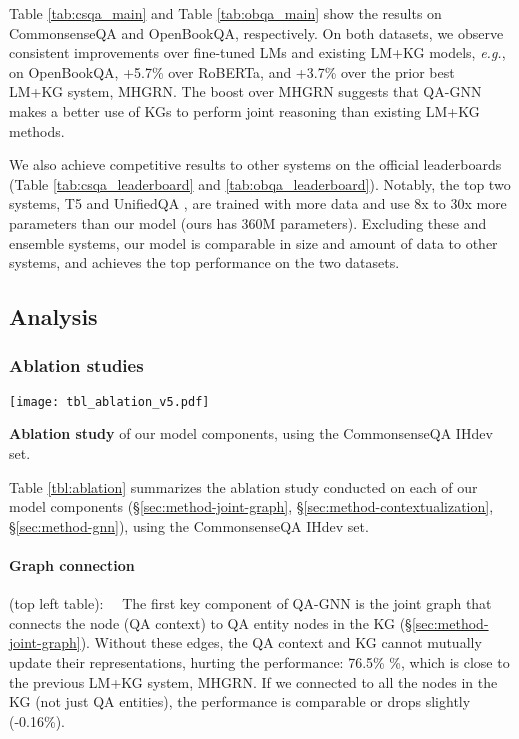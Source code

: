 \documentclass[11pt]{article}
\newcommand{\eg}{\textit{e.g.}}
\newcommand{\methodname}{QA-GNN\xspace}
\begin{document}
Table \ref{tab:csqa_main} and Table \ref{tab:obqa_main} show the results on CommonsenseQA and OpenBookQA, respectively. On both datasets, we observe consistent improvements over fine-tuned LMs and existing LM+KG models, \eg, on OpenBookQA, +5.7\% over RoBERTa, and +3.7\% over the prior best LM+KG system, MHGRN. 
The boost over MHGRN suggests that \methodname makes a better use of KGs to perform joint reasoning than existing LM+KG methods.

We also achieve competitive results to other systems on the official leaderboards (Table  \ref{tab:csqa_leaderboard} and \ref{tab:obqa_leaderboard}). Notably, the top two systems, T5 \cite{t5} and UnifiedQA \cite{khashabi2020unifiedqa}, are trained with more data and use 8x to 30x more parameters than our model (ours has 360M parameters).
Excluding these and ensemble systems, our model is comparable in size and amount of data to other systems, and achieves the top performance on the two datasets.



\subsection{Analysis}
\subsubsection{Ablation studies}
\label{sec:experiment-ablation}
\begin{table}[!t]
\hspace{-2mm}
\texttt{[image: tbl\_ablation\_v5.pdf]}
    \vspace{-7mm}
    \caption{\textbf{Ablation study} of our model components, using the CommonsenseQA IHdev set.}
\label{tbl:ablation}
\end{table}

Table \ref{tbl:ablation} summarizes the ablation study conducted on each of our model components (\S \ref{sec:method-joint-graph}, \S \ref{sec:method-contextualization}, \S \ref{sec:method-gnn}), using the CommonsenseQA IHdev set.

\paragraph{Graph connection}\!\!\!\!(top left table):~~ The first key component of \methodname is the joint graph that connects the  node (QA context) to QA entity nodes  in the KG (\S \ref{sec:method-joint-graph}). Without these edges, the QA context and KG cannot mutually update their representations, hurting the performance: 76.5\% \!\%, which is close to the previous LM+KG system, MHGRN. 
If we connected  to all the nodes in the KG (not just QA entities), the performance is comparable or drops slightly (-0.16\%).
\end{document}
